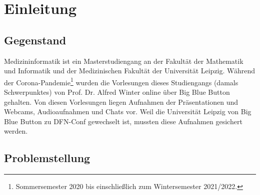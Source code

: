 
\chapter{Einleitung}\label{ch:introduction}

\section{Gegenstand}

Medizininformatik ist ein Masterstudiengang an der Fakultät der Mathematik und Informatik und der Medizinischen Fakultät der Universität Leipzig.
Während der Corona-Pandemie\footnote{Sommersemester 2020 bis einschließlich zum Wintersemester 2021/2022.} wurden die Vorlesungen dieses Studiengangs (damals Schwerpunktes) von Prof. Dr. Alfred Winter online über Big Blue Button gehalten.
Von diesen Vorlesungen liegen Aufnahmen der Präsentationen und Webcams, Audioaufnahmen und Chats vor. Weil die Universität Leipzig von Big Blue Button zu DFN-Conf gewechselt ist, mussten diese Aufnahmen gesichert werden.





\section{Problemstellung}



